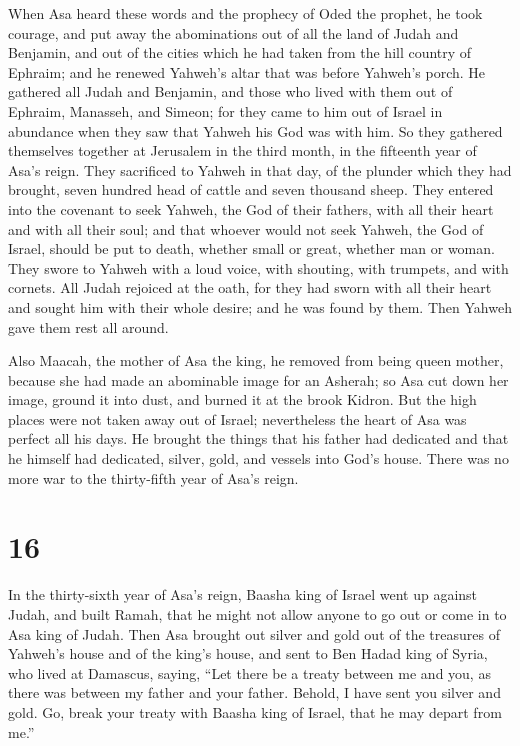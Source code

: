  When Asa heard these words and the prophecy of Oded the
prophet, he took courage, and put away the abominations out of all the
land of Judah and Benjamin, and out of the cities which he had taken
from the hill country of Ephraim; and he renewed Yahweh's altar that was
before Yahweh's porch.  He gathered all Judah and Benjamin,
and those who lived with them out of Ephraim, Manasseh, and Simeon; for
they came to him out of Israel in abundance when they saw that Yahweh
his God was with him.  So they gathered themselves together
at Jerusalem in the third month, in the fifteenth year of Asa's reign.
 They sacrificed to Yahweh in that day, of the plunder
which they had brought, seven hundred head of cattle and seven thousand
sheep.  They entered into the covenant to seek Yahweh, the
God of their fathers, with all their heart and with all their soul;
 and that whoever would not seek Yahweh, the God of Israel,
should be put to death, whether small or great, whether man or woman.
 They swore to Yahweh with a loud voice, with shouting,
with trumpets, and with cornets.  All Judah rejoiced at the
oath, for they had sworn with all their heart and sought him with their
whole desire; and he was found by them. Then Yahweh gave them rest all
around.

 Also Maacah, the mother of Asa the king, he removed from
being queen mother, because she had made an abominable image for an
Asherah; so Asa cut down her image, ground it into dust, and burned it
at the brook Kidron.  But the high places were not taken
away out of Israel; nevertheless the heart of Asa was perfect all his
days.  He brought the things that his father had dedicated
and that he himself had dedicated, silver, gold, and vessels into God's
house.  There was no more war to the thirty-fifth year of
Asa's reign.

\hypertarget{section-15}{%
\section{16}\label{section-15}}

 In the thirty-sixth year of Asa's reign, Baasha king of
Israel went up against Judah, and built Ramah, that he might not allow
anyone to go out or come in to Asa king of Judah.  Then Asa
brought out silver and gold out of the treasures of Yahweh's house and
of the king's house, and sent to Ben Hadad king of Syria, who lived at
Damascus, saying,  ``Let there be a treaty between me and
you, as there was between my father and your father. Behold, I have sent
you silver and gold. Go, break your treaty with Baasha king of Israel,
that he may depart from me.''

